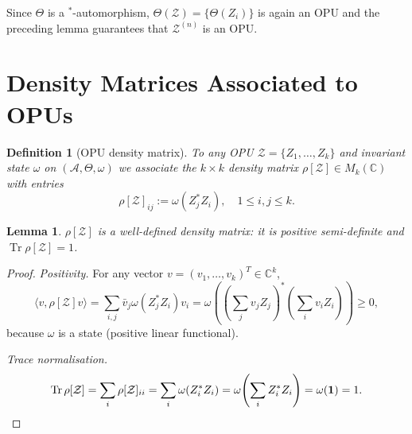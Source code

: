 \documentclass[12pt,a4paper]{article}
\newtheorem{lemma}[theorem]{Lemma}
\newtheorem{definition}[theorem]{Definition}
\DeclareMathOperator{\Tr}{Tr}
\newcommand{\A}{\mathcal{A}}
\begin{document}
Since $\Theta$ is a $^*$-automorphism, $\Theta(\mathcal{Z})=\{\Theta(Z_i)\}$
is again an OPU and the preceding lemma guarantees that $\mathcal{Z}^{(n)}$ is
an OPU.

\section{Density Matrices Associated to OPUs}

\begin{definition}[OPU density matrix]
\label{def:OPU_density}
To any OPU $\mathcal{Z}=\{Z_1,\ldots,Z_k\}$ and invariant state $\omega$ on
$(\A,\Theta,\omega)$ we associate the $k\times k$ density matrix
$\rho[\mathcal{Z}]\in M_k(\mathbb{C})$ with entries
\begin{equation}\label{eq:OPU_density}
  \rho[\mathcal{Z}]_{ij} := \omega(Z_j^* Z_i),\quad 1\leq i,j\leq k.
\end{equation}
\end{definition}

\begin{lemma}
$\rho[\mathcal{Z}]$ is a well-defined density matrix: it is positive
semi-definite and $\Tr\rho[\mathcal{Z}]=1$.
\end{lemma}
\begin{proof}
\textit{Positivity.} For any vector $v=(v_1,\ldots,v_k)^T\in\mathbb{C}^k$,
\[
  \langle v,\rho[\mathcal{Z}]v\rangle
  = \sum_{i,j}\bar{v}_j\omega(Z_j^* Z_i)v_i
  = \omega\!\left(\!\left(\sum_j v_j Z_j\right)^*\!\!\left(\sum_i v_i Z_i\right)\!\right)
  \geq 0,
\]
because $\omega$ is a state (positive linear functional).

\textit{Trace normalisation.}
\[
  \Tr\rho[\mathcal{Z}]
  = \sum_i\rho[\mathcal{Z}]_{ii}
  = \sum_i\omega(Z_i^* Z_i)
  = \omega\!\left(\sum_i Z_i^* Z_i\right)
  = \omega(\mathbf{1}) = 1.\qedhere
\]
\end{proof}
\end{document}
